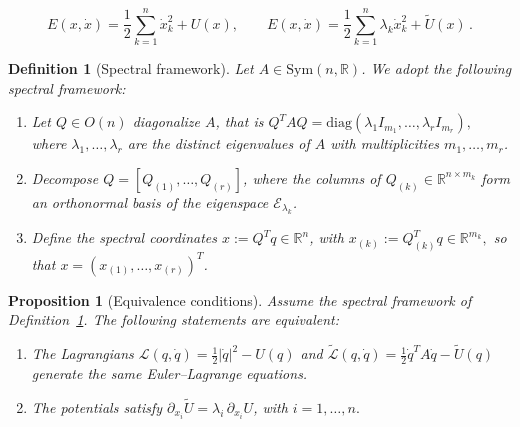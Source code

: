 \documentclass[10pt,a4paper]{amsart}
\newtheorem{definition}{Definition}
\newtheorem{proposition}{Proposition}
\begin{document}
\begin{equation}
\label{eq:energies}
E(x,\dot{x})=\frac{1}{2} \sum_{k=1}^n \dot{x}_k^2+U(x),
\quad\quad
E(x,\dot{x})=\frac{1}{2} \sum_{k=1}^n \lambda_k \dot{x}_k^2+\widetilde U(x)\,.
\end{equation}

\begin{definition}[Spectral framework]
\label{def:spectral}
Let $A \in \mathrm{Sym}(n,\mathbb{R})$. We adopt the following spectral framework:
\begin{enumerate}
\item Let $Q \in O(n)$ diagonalize $A$, that is
$
Q^T A Q = \mathrm{diag}(\lambda_1 I_{m_1}, \dots, \lambda_r I_{m_r}),
$
where $\lambda_1,\dots,\lambda_r$ are the distinct eigenvalues of $A$ with
multiplicities $m_1,\dots,m_r$.
\item Decompose $Q = [Q_{(1)}, \dots, Q_{(r)}]$, where the columns of
$Q_{(k)} \in \mathbb{R}^{n \times m_k}$ form an orthonormal basis of the eigenspace
$\mathcal{E}_{\lambda_k}$.
\item Define the spectral coordinates $x := Q^T q \in \mathbb{R}^n$, with
$
x_{(k)} := Q_{(k)}^T q \in \mathbb{R}^{m_k},
$
so that $x = (x_{(1)}, \dots, x_{(r)})^T$.
\end{enumerate}
\end{definition}

\begin{proposition}[Equivalence conditions]
\label{theo:eq_statmnt}
Assume the spectral framework of Definition~\ref{def:spectral}. The following
statements are equivalent:
\begin{enumerate}
\item
The Lagrangians
$
\mathcal{L}(q,\dot q)=\tfrac12|\dot q|^2-U(q)
$
and
$
\widetilde{\mathcal{L}}(q,\dot q)=\tfrac12 \dot q^T A \dot q-\widetilde U(q)
$
generate the same Euler--Lagrange equations.
\item
The potentials satisfy
$
\partial_{x_i}\widetilde U=\lambda_i\,\partial_{x_i}U$, with $i=1,\dots,n.
$
\end{enumerate}
\end{proposition}
\end{document}
